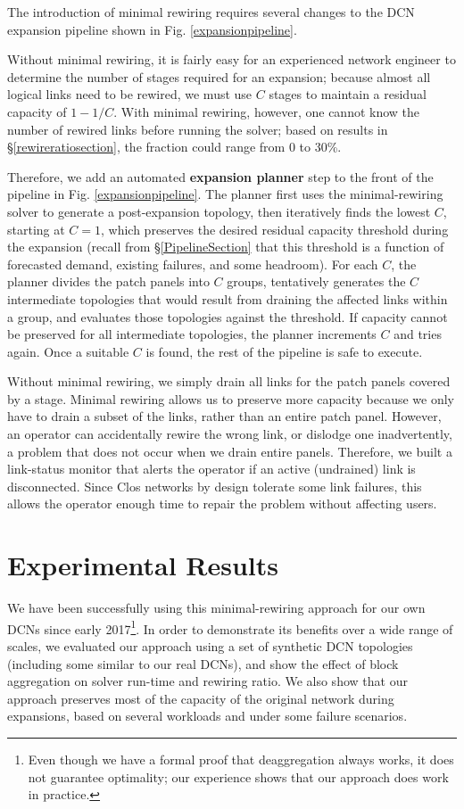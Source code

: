 \documentclass[letterpaper,twocolumn,10pt]{article}
\begin{document}
The introduction of minimal rewiring requires several changes to the DCN expansion pipeline shown in Fig. \ref{expansionpipeline}.

Without minimal rewiring, it is fairly easy for an experienced network engineer to determine the number of stages required for an expansion; because almost all logical links need to be rewired,
we must use $C$ stages to maintain a residual capacity of $1-1/C$. 
With minimal rewiring, however, one cannot know the number of rewired links before running the solver; based on results in \S\ref{rewireratiosection}, the fraction could range from 0 to 30\%.

Therefore, we add an automated \textbf{expansion planner} step to the front of the pipeline in Fig. \ref{expansionpipeline}.  The planner first uses the minimal-rewiring solver to generate a post-expansion topology, then iteratively finds the lowest $C$, starting at $C=1$, which preserves the desired residual capacity threshold during the expansion (recall from \S\ref{PipelineSection} that this threshold is a function of forecasted demand, existing failures, and some headroom).
For each $C$, the planner divides the patch panels into $C$ groups, tentatively generates the $C$ intermediate topologies that would result from draining the affected links within a group, and evaluates those topologies against the threshold.  If capacity cannot be preserved for all intermediate topologies, the planner increments $C$ and tries again.  Once a suitable $C$ is found, the rest of the pipeline is safe to execute.

Without minimal rewiring, we simply drain all links for the patch panels covered by a stage.  Minimal rewiring allows us to preserve more capacity because we only have to drain a subset of the links, rather than an entire patch panel.   However, an operator can accidentally rewire the wrong link, or dislodge one inadvertently, a problem that does not occur when we drain entire panels.  Therefore, we built a link-status monitor that alerts the operator if an active (undrained) link is disconnected.  Since Clos networks by design tolerate some link failures, this allows the operator enough time to repair the problem without affecting users.\section{Experimental Results}

We have been successfully using this minimal-rewiring approach for our own DCNs since early 2017\footnote{Even though we have a formal proof that deaggregation always works, it does not guarantee optimality;
our experience shows that our approach does work in practice.}. In order to demonstrate its benefits over a wide range of scales, we evaluated our approach using a set of synthetic DCN topologies (including some similar to our real DCNs), and show the effect of block aggregation on solver run-time and rewiring ratio.
We also show that our approach preserves most of the capacity of the original network during expansions, based on several workloads and under some failure scenarios.
 
\end{document}
